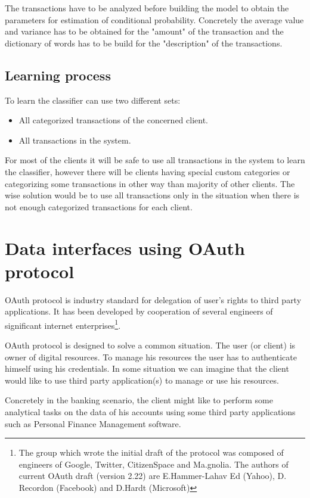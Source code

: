 The transactions have to be analyzed before building the model to obtain the parameters for estimation of conditional probability. Concretely the average value and variance has to be obtained for the "amount" of the transaction and the dictionary of words has to be build for the "description" of the transactions.

\subsection{Learning process}
To learn the classifier can use two different sets:

\begin{itemize}
	\item  All categorized transactions of the concerned client.
	\item  All transactions in the system.
\end{itemize}

For most of the clients it will be safe to use all transactions in the system to learn the classifier, however there will be clients having special custom categories or categorizing some transactions in other way than majority of other clients. The wise solution would be to use all transactions only in the situation when there is not enough categorized transactions for each client.

\section{Data interfaces using OAuth protocol}
OAuth protocol is industry standard for delegation of user's rights to third party applications.\cite{OAuth11} It has been developed by cooperation of several engineers of significant internet enterprises\footnote{The group which wrote the initial draft of the protocol was composed of engineers of Google, Twitter, CitizenSpace and Ma.gnolia. The authors of current OAuth draft (version 2.22) are E.Hammer-Lahav Ed (Yahoo), D. Recordon (Facebook) and D.Hardt (Microsoft)}.

OAuth protocol is designed to solve a common situation. The user (or client) is owner of digital resources. To manage his resources the user has to authenticate himself using his credentials. In some situation we can imagine that the client would like to use third party application(s) to manage or use his resources.

Concretely in the banking scenario, the client might like to perform some analytical tasks on the data of his accounts using some third party applications such as Personal Finance Management software.

